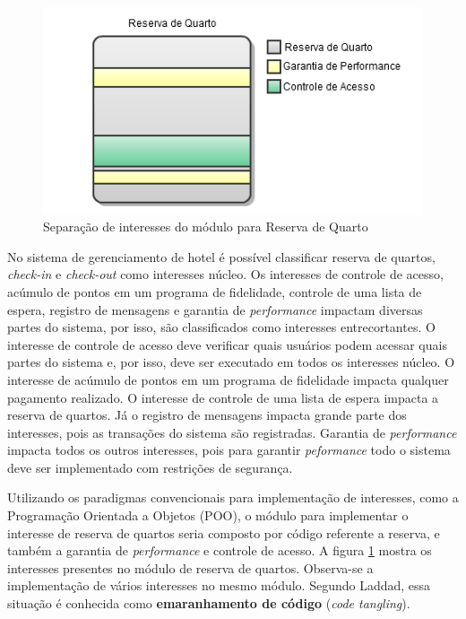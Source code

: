 \begin{figure}[!hb]
	\centering
	\includegraphics{img/context_aspect_concerns.png}
	\caption{Separação de interesses do módulo para Reserva de Quarto}\label{fig:context_aspect_concerns}
\end{figure}

No sistema de gerenciamento de hotel é possível classificar reserva de quartos, \textit{check-in} e \textit{check-out} como interesses núcleo.
Os interesses de controle de acesso, acúmulo de pontos em um programa de fidelidade, controle de uma lista de espera, registro de mensagens e garantia
de \textit{performance} impactam diversas partes do sistema, por isso, são classificados como interesses entrecortantes. O interesse de controle de acesso deve 
verificar quais usuários podem acessar quais partes do sistema e, por isso, deve ser executado em todos os interesses núcleo. O interesse de
acúmulo de pontos em um programa de fidelidade impacta qualquer pagamento realizado. O interesse de controle de uma lista de espera impacta a
reserva de quartos. Já o registro de mensagens impacta grande parte dos interesses, pois as transações do sistema são registradas. Garantia de
\textit{performance} impacta todos os outros interesses, pois para garantir \textit{peformance} todo o sistema deve ser implementado com restrições
de segurança.

Utilizando os paradigmas convencionais para implementação de interesses, como a Programação Orientada a Objetos (POO), o módulo
para implementar o interesse de reserva de quartos seria composto  por código referente a reserva, e também a garantia de \textit{performance} e 
controle de acesso. A figura \ref{fig:context_aspect_concerns} mostra os interesses presentes no módulo de reserva de quartos. Observa-se a
implementação de vários interesses no mesmo módulo. Segundo Laddad\cite{Laddad:2003:AAP:993468}, essa situação é conhecida como \textbf{emaranhamento
de código} (\textit{code tangling}).

